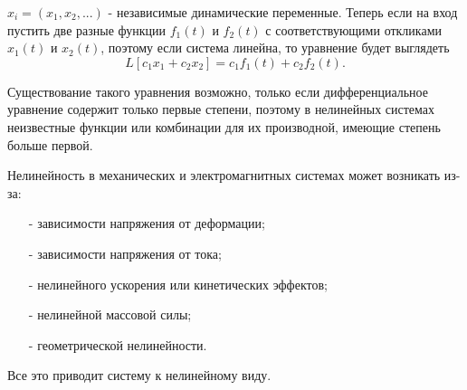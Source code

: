  $x_i=(x_1, x_2,...)$ - независимые динамические переменные. Теперь если на вход пустить две разные функции $f_1 (t)$ и $f_2 (t)$ с соответствующими откликами $x_1(t)$ и $x_2(t)$, поэтому если система линейна, то уравнение будет выглядеть
\begin{equation}
L[c_1 x_1 + c_2 x_2] = c_1 f_1 (t) + c_2 f_2(t).
\end{equation}

Существование такого уравнения возможно, только если дифференциальное уравнение содержит только первые степени, поэтому в нелинейных системах неизвестные функции или комбинации для их производной, имеющие степень больше первой. 

Нелинейность в механических и электромагнитных системах может возникать из-за:
\begin{itemize}
\item [-] зависимости напряжения от деформации;
\item [-] зависимости напряжения от тока;
\item [-] нелинейного ускорения или кинетических эффектов;
\item [-] нелинейной массовой силы;
\item [-] геометрической нелинейности.
\end{itemize}

\noindent Все это приводит систему к нелинейному виду.










